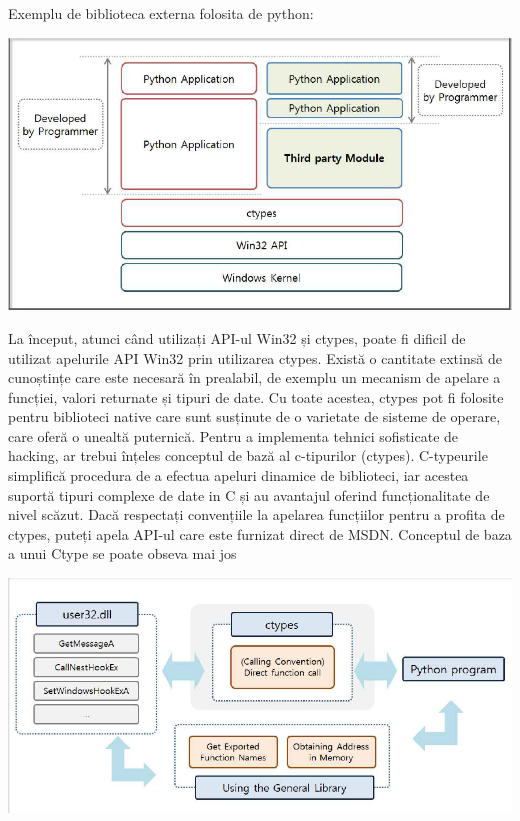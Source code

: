 \documentclass[oneside,20pt]{article}          %
\begin{document}
Exemplu de biblioteca externa folosita de python:
\begin{center}
\includegraphics[height=5 cm]{3.png}
\end{center}
La început, atunci când utilizați API-ul Win32 și ctypes, poate fi dificil de utilizat apelurile API Win32 prin utilizarea ctypes. Există
o cantitate extinsă de cunoștințe care este necesară în prealabil, de exemplu
un mecanism de apelare a funcției, valori returnate și tipuri de date.
Cu toate acestea, ctypes pot fi folosite pentru biblioteci native care sunt
susținute de o varietate de sisteme de operare, care oferă o unealtă puternică. Pentru a implementa tehnici sofisticate de hacking,
ar trebui înțeles conceptul de bază al c-tipurilor (ctypes).
 C-typeurile simplifică procedura de a efectua apeluri dinamice de biblioteci,
iar acestea suportă tipuri complexe de date in C și au avantajul
oferind funcționalitate de nivel scăzut. Dacă respectați convențiile la
apelarea funcțiilor pentru a profita de ctypes, puteți apela API-ul
care este furnizat direct de MSDN.
Conceptul de baza a unui Ctype se poate obseva mai jos
\begin{center}
\includegraphics[height=5 cm]{4.png}
\end{center}
\end{document}

